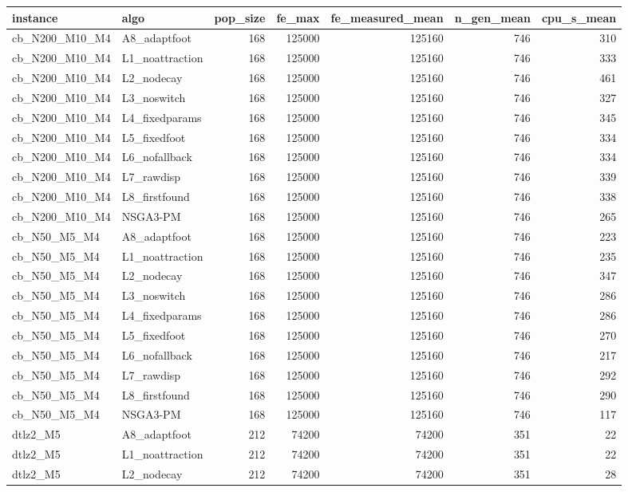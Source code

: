 \begin{tabular}{llrrrrr}
\toprule
instance & algo & pop_size & fe_max & fe_measured_mean & n_gen_mean & cpu_s_mean \\
\midrule
cb_N200_M10_M4 & A8_adaptfoot & 168 & 125000 & 125160 & 746 & 310 \\
cb_N200_M10_M4 & L1_noattraction & 168 & 125000 & 125160 & 746 & 333 \\
cb_N200_M10_M4 & L2_nodecay & 168 & 125000 & 125160 & 746 & 461 \\
cb_N200_M10_M4 & L3_noswitch & 168 & 125000 & 125160 & 746 & 327 \\
cb_N200_M10_M4 & L4_fixedparams & 168 & 125000 & 125160 & 746 & 345 \\
cb_N200_M10_M4 & L5_fixedfoot & 168 & 125000 & 125160 & 746 & 334 \\
cb_N200_M10_M4 & L6_nofallback & 168 & 125000 & 125160 & 746 & 334 \\
cb_N200_M10_M4 & L7_rawdisp & 168 & 125000 & 125160 & 746 & 339 \\
cb_N200_M10_M4 & L8_firstfound & 168 & 125000 & 125160 & 746 & 338 \\
cb_N200_M10_M4 & NSGA3-PM & 168 & 125000 & 125160 & 746 & 265 \\
cb_N50_M5_M4 & A8_adaptfoot & 168 & 125000 & 125160 & 746 & 223 \\
cb_N50_M5_M4 & L1_noattraction & 168 & 125000 & 125160 & 746 & 235 \\
cb_N50_M5_M4 & L2_nodecay & 168 & 125000 & 125160 & 746 & 347 \\
cb_N50_M5_M4 & L3_noswitch & 168 & 125000 & 125160 & 746 & 286 \\
cb_N50_M5_M4 & L4_fixedparams & 168 & 125000 & 125160 & 746 & 286 \\
cb_N50_M5_M4 & L5_fixedfoot & 168 & 125000 & 125160 & 746 & 270 \\
cb_N50_M5_M4 & L6_nofallback & 168 & 125000 & 125160 & 746 & 217 \\
cb_N50_M5_M4 & L7_rawdisp & 168 & 125000 & 125160 & 746 & 292 \\
cb_N50_M5_M4 & L8_firstfound & 168 & 125000 & 125160 & 746 & 290 \\
cb_N50_M5_M4 & NSGA3-PM & 168 & 125000 & 125160 & 746 & 117 \\
dtlz2_M5 & A8_adaptfoot & 212 & 74200 & 74200 & 351 & 22 \\
dtlz2_M5 & L1_noattraction & 212 & 74200 & 74200 & 351 & 22 \\
dtlz2_M5 & L2_nodecay & 212 & 74200 & 74200 & 351 & 28 \\

\end{tabular}
